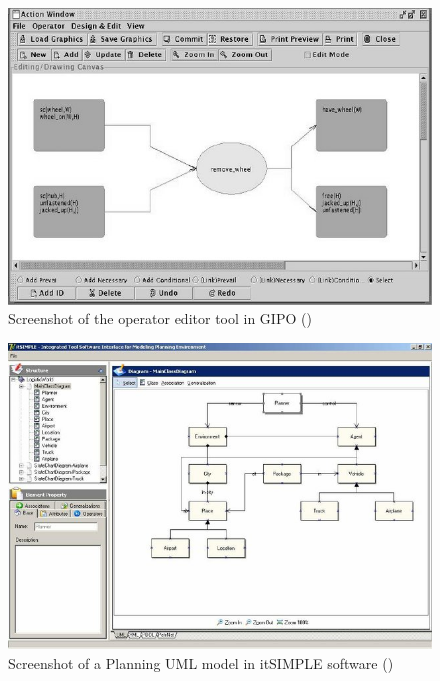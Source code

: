 \begin{figure}[h]
	\centering
	\includegraphics[width=0.7\linewidth]{figures/gipoaction}
	\caption{Screenshot of the operator editor tool in GIPO (\cite{mccluskey2005using})}
	\label{fig:gipoaction}
\end{figure}

\begin{figure}[h]
	\centering
	\includegraphics[width=0.7\linewidth]{figures/itsimple}
	\caption{Screenshot of a Planning UML model in itSIMPLE software (\cite{vaquero2013itsimple})}
	\label{fig:itSimple}
\end{figure}

